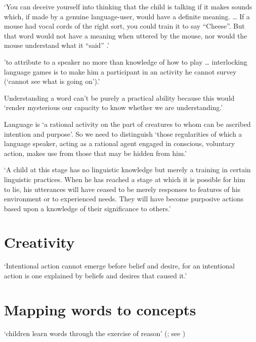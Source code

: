 \documentclass[12pt]{extarticle}
\begin{document}
\begin{multicols}{3}
‘You can deceive yourself into thinking that the child is talking if it makes sounds which, if made by a genuine language-user, would have a definite meaning.
… If a mouse had vocal cords of the right sort, you could train it to say “Cheese”. But that word would not have a meaning when uttered by the mouse,
nor would the mouse understand what it “said”
.’
\citep[p.\ 11]{Davidson:1999ju}
 
'to attribute to a speaker no more than knowledge of how to play … interlocking language games is to make him a participant in an activity he cannot survey (‘cannot see what is going on’).'
\citep[p.\ 224]{Dummett:1979fb}
 
Understanding a word can’t be purely a practical ability because this would ‘render mysterious our capacity to know whether we are understanding.’
\citep[p.\ 93]{Dummett:1991yj}
 
Language is ‘a rational activity on the part of creatures to whom can be ascribed intention and purpose’. So we need to distinguish ‘those regularities of which a language speaker, acting as a rational agent engaged in conscious, voluntary action, makes use from those that may be hidden from him.’
\citep[p.\ 104]{Dummett:1978zv}
 
‘A child at this stage has no linguistic knowledge but merely a training in certain linguistic practices. When he has reached a stage at which it is possible for him to lie, his utterances will have ceased to be merely responses to features of his environment or to experienced needs. They will have become purposive actions based upon a knowledge of their significance to others.’
\citep[p.\ 95]{Dummett:1991ug}
 
 
 
\section{Creativity}
 
‘Intentional action cannot emerge before belief and desire, for an intentional action is one explained by beliefs and desires that caused it.’
\citep[p.\ 10]{Davidson:1999ju}
 
 
 
\section{Mapping words to concepts}
 
‘children learn words through the exercise of reason’
(\citealp[p.\ 1103]{Bloom:2001ka}; see \citealp{Bloom:2000qz})
 

\end{multicols}
\end{document}
